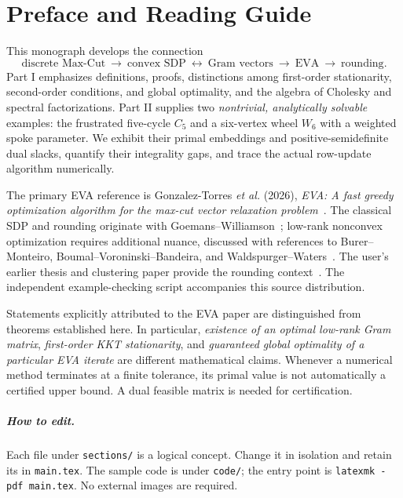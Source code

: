 \chapter*{Preface and Reading Guide}
This monograph develops the connection
\[
\text{discrete Max-Cut}\ \longrightarrow\ \text{convex SDP}\ \longleftrightarrow\
\text{Gram vectors}\ \longrightarrow\ \text{EVA}\ \longrightarrow\ \text{rounding}.
\]
Part I emphasizes definitions, proofs, distinctions among first-order stationarity, second-order conditions, and global optimality, and the algebra of Cholesky and spectral factorizations. Part II supplies two \emph{nontrivial, analytically solvable} examples: the frustrated five-cycle $C_5$ and a six-vertex wheel $W_6$ with a weighted spoke parameter. We exhibit their primal embeddings and positive-semidefinite dual slacks, quantify their integrality gaps, and trace the actual row-update algorithm numerically.

The primary EVA reference is Gonzalez-Torres \emph{et al.} (2026), \emph{EVA: A fast greedy optimization algorithm for the max-cut vector relaxation problem}~\cite{eva2026}. The classical SDP and rounding originate with Goemans--Williamson~\cite{gw1995}; low-rank nonconvex optimization requires additional nuance, discussed with references to Burer--Monteiro, Boumal--Voroninski--Bandeira, and Waldspurger--Waters~\cite{burer2003,boumal2016,boumal2020,waldspurger2020}. The user's earlier thesis and clustering paper provide the rounding context~\cite{rodriguez2021,rodriguez2020}. The independent example-checking script accompanies this source distribution.

\begin{caution}
Statements explicitly attributed to the EVA paper are distinguished from theorems established here. In particular, \emph{existence of an optimal low-rank Gram matrix}, \emph{first-order KKT stationarity}, and \emph{guaranteed global optimality of a particular EVA iterate} are different mathematical claims. Whenever a numerical method terminates at a finite tolerance, its primal value is not automatically a certified upper bound. A dual feasible matrix is needed for certification.
\end{caution}

\paragraph{How to edit.} Each file under \texttt{sections/} is a logical concept. Change it in isolation and retain its \verb|| in \texttt{main.tex}. The sample code is under \texttt{code/}; the entry point is \texttt{latexmk -pdf main.tex}. No external images are required.
